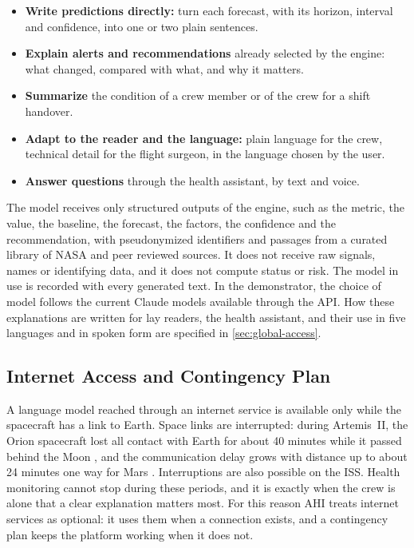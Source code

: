 \begin{itemize}
\item \textbf{Write predictions directly:} turn each forecast, with its horizon, interval and confidence, into one or two plain sentences.
\item \textbf{Explain alerts and recommendations} already selected by the engine: what changed, compared with what, and why it matters.
\item \textbf{Summarize} the condition of a crew member or of the crew for a shift handover.
\item \textbf{Adapt to the reader and the language:} plain language for the crew, technical detail for the flight surgeon, in the language chosen by the user.
\item \textbf{Answer questions} through the health assistant, by text and voice.
\end{itemize}

The model receives only structured outputs of the engine, such as the metric, the value, the baseline, the forecast, the factors, the confidence and the recommendation, with pseudonymized identifiers and passages from a curated library of NASA and peer reviewed sources. It does not receive raw signals, names or identifying data, and it does not compute status or risk. The model in use is recorded with every generated text. In the demonstrator, the choice of model follows the current Claude models available through the API. How these explanations are written for lay readers, the health assistant, and their use in five languages and in spoken form are specified in \ref{sec:global-access}.

\subsection{Internet Access and Contingency Plan}
\label{subsec:offline-llm}

A language model reached through an internet service is available only while the spacecraft has a link to Earth. Space links are interrupted: during Artemis~II, the Orion spacecraft lost all contact with Earth for about 40 minutes while it passed behind the Moon \cite{ctv_artemis2_blackout}, and the communication delay grows with distance up to about 24 minutes one way for Mars \cite{nasa_space_communications_seven_things}. Interruptions are also possible on the ISS. Health monitoring cannot stop during these periods, and it is exactly when the crew is alone that a clear explanation matters most. For this reason AHI treats internet services as optional: it uses them when a connection exists, and a contingency plan keeps the platform working when it does not.

